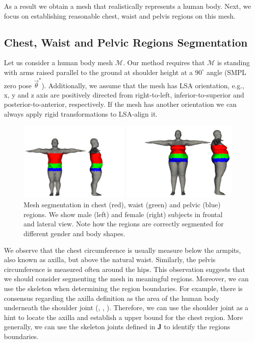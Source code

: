 \documentclass[runningheads, orivec]{llncs}
\begin{document}
As a result we obtain a mesh that realistically represents a human body. Next, 
we focus on establishing reasonable chest, waist and pelvis regions on this 
mesh.

\subsection{Chest, Waist and Pelvic Regions 
Segmentation}\label{subsec:three_regions}

Let us consider a human body mesh $\mathcal{M}$. Our method requires that 
$\mathcal{M}$ is standing with arms raised 
parallel to the 
ground at shoulder height at a $90^\circ$ angle (SMPL zero pose
$\vec{\theta}^*$). Additionally, we assume that the mesh 
has LSA orientation, e.g., x, y and z axis are positively directed from 
right-to-left, inferior-to-superior and posterior-to-anterior, respectively. If 
the mesh has another orientation we can always apply rigid transformations to 
LSA-align it.

\begin{figure}[t]
	\begin{center}
		\includegraphics[width=\linewidth]{subjects_2_6_calvis_segmented.png}
	\end{center}
	\caption{Mesh segmentation in chest (red), waist (green) and pelvic (blue) 
	regions. We show male (left) and female (right) subjects in frontal and 
	lateral view. Note how the regions are correctly segmented for different 
	gender and body shapes.}
	\label{fig:mesh_segmented}
\end{figure}

We observe that the chest circumference is usually measure below the armpits, 
also known as axilla, but above the natural waist. Similarly, the pelvis 
circumference is measured often around the hips. This observation suggests that 
we should consider segmenting the mesh in meaningful regions. Moreover, we can 
use the skeleton when determining the region boundaries. For 
example, there is consensus regarding the axilla 
definition as the area of the human body underneath the shoulder joint 
(\cite{MeSH.axilla}, \cite{FMA.axilla}, \cite{TA.axilla}). Therefore, we can 
use the shoulder joint as a hint to locate the axilla and establish a upper 
bound for the chest region. More generally, we can use the 
skeleton joints defined in $\mathbf{J}$ to identify the regions boundaries.
\end{document}
